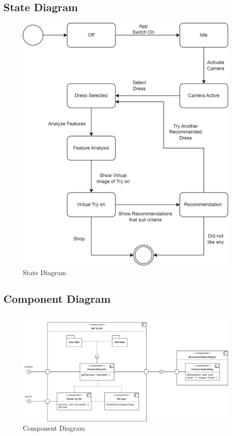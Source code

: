 	\subsection{State Diagram}
		\begin{figure}[h!]
			\includegraphics[width=\textwidth]{components/images/state.png}
			\caption{State Diagram}
			\label{fig:state}
		\end{figure}

	\pagebreak

	\subsection{Component Diagram}
		\begin{figure}[h!]
			\includegraphics[width=\textwidth]{components/images/component.png}
			\caption{Component Diagram}
			\label{fig:component}
		\end{figure}

